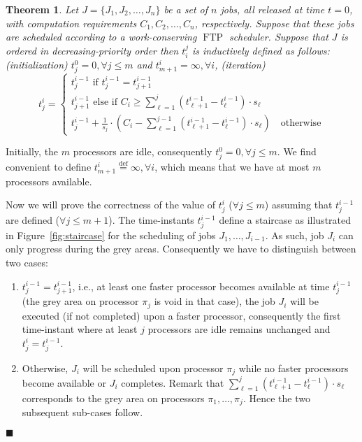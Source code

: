 \documentclass[10pt,english,a4paper]{article}
\newcommand{\ds}{\displaystyle}
\newcommand{\equals}{\stackrel{\mathrm{def}}{=}}
\newtheorem{theorem}{Theorem}
\newenvironment{proof}[1][Proof]{\begin{trivlist}
\item[\hskip \labelsep {\bfseries #1}]}{\end{trivlist}}
\newtheorem{validity test}{Validity Test}
\newcommand{\FTP}{\operatorname{FTP}}
\newcommand{\fin}{\hfill{\small $\blacksquare$}}     \newcommand{\oh}[1]{\ensuremath{\mathcal{0}{(#1)}}} \def\thefootnote{\arabic{footnote}}
\begin{document}
\begin{theorem}\label{theo3}
Let $J = \{J_1, J_2, \ldots, J_n\}$ be a set of $n$ jobs, all released at time $t = 0$, with computation requirements $C_1, C_2, \ldots, C_n$, respectively. Suppose that these jobs are scheduled according to a work-conserving $\FTP$ scheduler. Suppose that $J$ is ordered in decreasing-priority order then $t_{i}^{j}$ is inductively defined as follows:
 (initialization) $t_{j}^{0} = 0, \forall j \leq m$ and $t_{m+1}^{i} = \infty, \forall i$, (iteration) 
\begin{equation*}
t_{j}^{i} = 
\begin{cases}
t_{j}^{i-1} \text{\ \ \ \ \ \ \ \ \ \ \ \ if } t_{j}^{i-1} = t_{j+1}^{i-1} \quad \\ 
t_{j+1}^{i-1} \text{\ \ \ \ \ \ \ \ \ \ \ \ else if } C_{i} \geq \sum_{\ell=1}^{j} (t_{\ell+1}^{i-1} - t_{\ell}^{i-1})\cdot s_{\ell} \quad \\ 
t_{j}^{i-1} + \ds\frac{1}{s_j} \cdot \left(C_{i} - \ds\sum_{\ell=1}^{j-1} (t_{\ell+1}^{i-1} - t_{\ell}^{i-1})\cdot s_{\ell}\right) \quad \text{otherwise}
\end{cases}
\end{equation*}
\end{theorem}

\begin{proof} 
Initially, the $m$ processors are idle, consequently $t_{j}^{0} = 0, \forall j \leq m$. We find convenient to define $t_{m+1}^{i} \equals \infty, \forall i$, which means that we have at most $m$ processors available.

Now we will prove the correctness of the value of $t_{j}^{i}$ ($\forall j \leq m$) assuming that $t_{j}^{i-1}$ are defined ($\forall j \leq m+1$). The time-instants $t_{j}^{i-1}$ define a staircase as illustrated in Figure~\ref{fig:staircase} for the scheduling of jobs $J_{1}, \ldots, J_{i-1}$. As such, job $J_{i}$ can only progress during the grey areas. Consequently we have to distinguish between two cases:
\begin{enumerate}
\item $t_{j}^{i-1} = t_{j+1}^{i-1}$, i.e., at least one faster processor becomes available at time $t_{j}^{i-1}$ (the grey area on processor $\pi_{j}$ is void in that case), the job $J_{i}$ will be executed (if not completed) upon a faster processor, consequently the first time-instant where at least $j$ processors are idle remains unchanged and $t_{j}^{i} = t_{j}^{i-1}$.

\item Otherwise, $J_{i}$ will be scheduled upon processor $\pi_{j}$ while no faster processors become available or $J_{i}$ completes. Remark that $\sum_{\ell=1}^{j} (t_{\ell+1}^{i-1} - t_{\ell}^{i-1})\cdot s_{\ell}$ corresponds to the grey area on processors $\pi_{1}, \dots, \pi_{j}$. Hence the two subsequent sub-cases follow.
\end{enumerate}
\fin
\end{proof}
\end{document}

